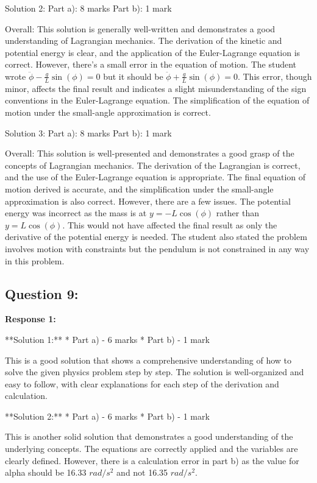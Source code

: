 \documentclass[a4paper,11pt]{article}
\begin{document}
Solution 2:
Part a): 8 marks
Part b): 1 mark

Overall: This solution is generally well-written and demonstrates a good understanding of Lagrangian mechanics. The derivation of the kinetic and potential energy is clear, and the application of the Euler-Lagrange equation is correct. However, there's a small error in the equation of motion. The student wrote \( \ddot{\phi} - \frac{g}{L} \sin(\phi) = 0 \) but it should be \( \ddot{\phi} + \frac{g}{L} \sin(\phi) = 0 \). This error, though minor, affects the final result and indicates a slight misunderstanding of the sign conventions in the Euler-Lagrange equation. The simplification of the equation of motion under the small-angle approximation is correct.

Solution 3:
Part a): 8 marks
Part b): 1 mark

Overall: This solution is well-presented and demonstrates a good grasp of the concepts of Lagrangian mechanics. The derivation of the Lagrangian is correct, and the use of the Euler-Lagrange equation is appropriate. The final equation of motion derived is accurate, and the simplification under the small-angle approximation is also correct. However, there are a few issues. The potential energy was incorrect as the mass is at \(y = -L \cos(\phi) \) rather than \(y = L \cos(\phi) \). This would not have affected the final result as only the derivative of the potential energy is needed. The student also stated the problem involves motion with constraints but the pendulum is not constrained in any way in this problem.

\subsection*{Question 9:}

\textbf{Response 1:}

**Solution 1:**
*   Part a) - 6 marks
*   Part b) - 1 mark

This is a good solution that shows a comprehensive understanding of how to solve the given physics problem step by step. The solution is well-organized and easy to follow, with clear explanations for each step of the derivation and calculation.

**Solution 2:**
*   Part a) - 6 marks
*   Part b) - 1 mark

This is another solid solution that demonstrates a good understanding of the underlying concepts. The equations are correctly applied and the variables are clearly defined. However, there is a calculation error in part b) as the value for alpha should be 16.33 $rad/s^2$ and not 16.35 $rad/s^2$.
\end{document}
